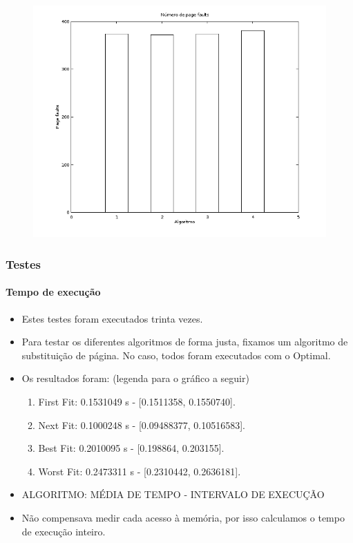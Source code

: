 \documentclass{beamer}
\begin{document}
\begin{frame}
	\begin{figure}[!h]
		\centering
		\includegraphics[scale=0.4]{c.png}
	\end{figure}
\end{frame}

\begin{frame}
	\frametitle{Testes}
	\framesubtitle{Tempo de execução}
	\begin{itemize}
		\item Estes testes foram executados trinta vezes.
		\item Para testar os diferentes algoritmos de forma justa, fixamos um algoritmo de substituição de página. No caso, todos foram executados com o Optimal.
		\item Os resultados foram: (legenda para o gráfico a seguir)
		\begin{enumerate}
			\item First Fit: 0.1531049 s - [0.1511358, 0.1550740].
			\item Next Fit: 0.1000248 s - [0.09488377, 0.10516583].
			\item Best Fit: 0.2010095 s - [0.198864, 0.203155].
			\item Worst Fit: 0.2473311 s - [0.2310442, 0.2636181].
		\end{enumerate}
		\item ALGORITMO: MÉDIA DE TEMPO - INTERVALO DE EXECUÇÃO
		\item Não compensava medir cada acesso à memória, por isso calculamos o tempo de execução inteiro.
	\end{itemize}
\end{frame}
\end{document}
